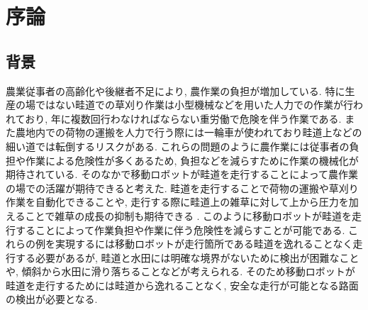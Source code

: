 \chapter{序論}
\section{背景}
農業従事者の高齢化や後継者不足により, 農作業の負担が増加している. 
特に生産の場ではない畦道での草刈り作業は小型機械などを用いた人力での作業が行われており, 年に複数回行わなければならない重労働で危険を伴う作業である. 
また農地内での荷物の運搬を人力で行う際には一輪車が使われており畦道上などの細い道では転倒するリスクがある. 
これらの問題のように農作業には従事者の負担や作業による危険性が多くあるため, 負担などを減らすために作業の機械化が期待されている.
そのなかで移動ロボットが畦道を走行することによって農作業の場での活躍が期待できると考えた. 
畦道を走行することで荷物の運搬や草刈り作業を自動化できることや, 走行する際に畦道上の雑草に対して上から圧力を加えることで雑草の成長の抑制も期待できる\cite{長橋孝哉2019ニューラルネットワークを用いた畦道の雑草検出に関する研究}
. 
このように移動ロボットが畦道を走行することによって作業負担や作業に伴う危険性を減らすことが可能である. 
これらの例を実現するには移動ロボットが走行箇所である畦道を逸れることなく走行する必要があるが, 畦道と水田には明確な境界がないために検出が困難なことや, 傾斜から水田に滑り落ちることなどが考えられる. 
そのため移動ロボットが畦道を走行するためには畦道から逸れることなく, 安全な走行が可能となる路面の検出が必要となる.

%
